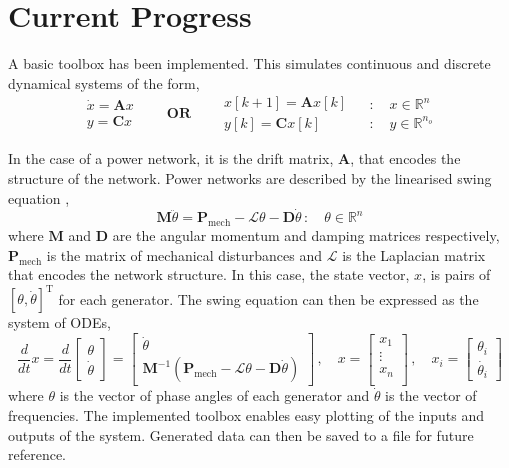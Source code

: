 \documentclass[11pt,a4paper]{article}
\begin{document}
\section*{Current Progress}
A basic toolbox has been implemented. This simulates continuous and discrete dynamical systems of the form, 
\begin{equation*}
\begin{aligned}
\dot{x} = \textbf{A}x \, & \quad  \\
y = \textbf{C}x \, & \quad 
\end{aligned}
\textbf{OR}
\begin{aligned}
\quad \, &x[k+1]=\textbf{A}x[k] \\
\quad \, &y[k]=\textbf{C}x[k] 
\end{aligned}
\begin{aligned}
&:\quad  x \in \mathbb{R}^{n} \\
&: \quad y \in \mathbb{R}^{n_o}
\end{aligned}
\end{equation*}

In the case of a power network, it is the drift matrix, $\textbf{A}$, that encodes the structure of the network. Power networks are described by the linearised swing equation \cite[eq 5.8]{Machowski1997},
\begin{equation*}
\textbf{M} \ddot{\theta} = \textbf{P}_{\text{mech}} - \mathcal{L}\theta - \textbf{D}\dot{\theta} \, : \quad \theta \in \mathbb{R}^n
\end{equation*}
where $\textbf{M}$ and $\textbf{D}$ are the angular momentum and damping matrices respectively, $\textbf{P}_{\text{mech}}$ is the matrix of mechanical disturbances and $\mathcal{L}$ is the Laplacian matrix that encodes the network structure. In this case, the state vector, $x$, is pairs of $[\theta, \dot{\theta}]^{\text{T}}$ for each generator. The swing equation can then be expressed as the system of ODEs,
\begin{equation*}
\frac{d}{dt}x= 
\frac{d}{dt}\begin{bmatrix}
\theta \\
\dot{\theta}
\end{bmatrix}
= \begin{bmatrix}
\dot{\theta} \\
\textbf{M}^{-1} (\textbf{P}_{\text{mech}} - \mathcal{L}\theta - \textbf{D}\dot{\theta})
\end{bmatrix} \, , \quad
x = \begin{bmatrix}
x_1 \\
\vdots \\
x_n \\
\end{bmatrix}
\, , \quad
x_i = \begin{bmatrix}
\theta_i \\
\dot{\theta_i}
\end{bmatrix}
\end{equation*}
where $\theta$ is the vector of phase angles of each generator and $\dot{\theta}$ is the vector of frequencies.
The implemented toolbox enables easy plotting of the inputs and outputs of the system. Generated data can then be saved to a file for future reference. 
\end{document}
